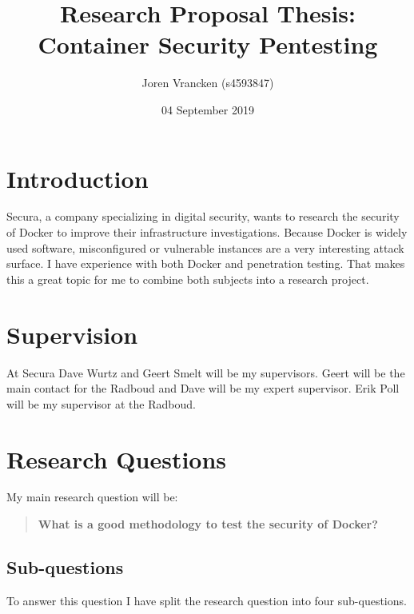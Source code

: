 \documentclass{article}
\title{Research Proposal Thesis:\\Container Security Pentesting}
\author{Joren Vrancken (s4593847)}
\date{04 September 2019}
\begin{document}
\maketitle

\section{Introduction}
Secura, a company specializing in digital security, wants to research the security of Docker to improve their infrastructure investigations. Because Docker is widely used software, misconfigured or vulnerable instances are a very interesting attack surface. I have experience with both Docker and penetration testing. That makes this a great topic for me to combine both subjects into a research project.

\section{Supervision}
At Secura Dave Wurtz and Geert Smelt will be my supervisors. Geert will be the main contact for the Radboud and Dave will be my expert supervisor. Erik Poll will be my supervisor at the Radboud.

\section{Research Questions}
My main research question will be:
\begin{quote}
    \textbf{What is a good methodology to test the security of Docker?}
\end{quote}

\subsection{Sub-questions}
To answer this question I have split the research question into four sub-questions.
\end{document}
